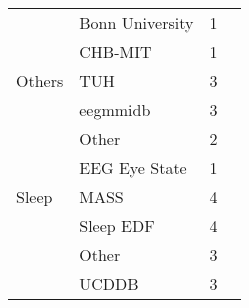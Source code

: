 \begin{tabular}{llrl}
      & Bonn University &            1 &                                                                                                                                                              \cite{Wen2018} \\
      & CHB-MIT &            1 &                                                                                                                                                              \cite{Wen2018} \\
Others & TUH &            3 &                                                                                                                              \cite{Schirrmeister2017a, Roy2018, Zhang2018a} \\
      & eegmmidb &            3 &                                                                                                                                   \cite{Zhang2018a, Zhang2017e, Zhang2017c} \\
      & Other &            2 &                                                                                                                                           \cite{VanPutten2018b, Zhang2018a} \\
      & EEG Eye State &            1 &                                                                                                                                                             \cite{Lee2018a} \\
Sleep & MASS &            4 &                                                                                                                   \cite{Phan2018, Chambon2018, Supratak2017, dong2018mixed} \\
      & Sleep EDF &            4 &                                                                                                                   \cite{Vilamala2017, Supratak2017, Xie2017, Tsinalis2016a} \\
      & Other &            3 &                                                                                                                                     \cite{Sors2018, Tripathy2018, Giri2016} \\
      & UCDDB &            3 &                                                                                                                           \cite{Langkvist2018, Manzano2017a, Langkvist2012} \\
\bottomrule
\end{tabular}
